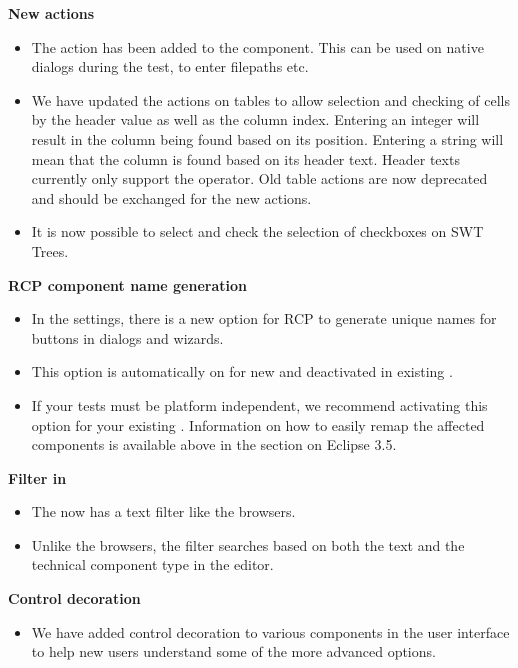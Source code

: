 \textbf{New actions}
\begin{itemize}
\item The action  has been added to the  component. This can be used on  native dialogs during the test, to enter filepaths etc. 
\item We have updated the actions on tables to allow selection and checking of cells by the header value as well as the column index. Entering an integer will result in the column being found based on its position. Entering a string will mean that the column is found based on its header text. Header texts currently only support the  operator. Old table actions are now deprecated and should be exchanged for the new actions. 
\item It is now possible to select and check the selection of checkboxes on SWT Trees. 
\end{itemize}

\textbf{RCP component name generation}
\begin{itemize}
\item In the \gdaut{} settings, there is a new option for RCP \gdauts{} to generate unique names for buttons in dialogs and wizards. %
\item This option is automatically on for new \gdprojects{} and deactivated in existing \gdprojects{}. 
\item If your tests must be platform independent, we recommend activating this option for your existing \gdprojects{}. Information on how to easily remap the affected components is available above in the section on Eclipse 3.5. 
\end{itemize}

\textbf{Filter in \gdomeditor{}}
\begin{itemize}
\item The \gdomeditor{} now has a text filter like the browsers. 
\item Unlike the browsers, the \gdomeditor{} filter searches based on both the text and the technical component type in the editor. 
\end{itemize}

\textbf{Control decoration}
\begin{itemize}
\item We have added control decoration to various components in the user interface to help new users understand some of the more advanced options. 
\end{itemize}

